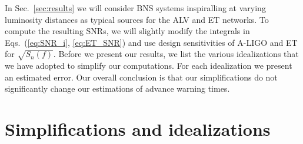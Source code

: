 \documentclass[prd,amsmath,amssymb,aps,floats,amsfonts,notitlepage,superscriptaddress,eqsecnum,nofootinbib,10pt]{revtex4-1}
\begin{document}
In Sec.~\ref{sec:results} we will consider BNS systems inspiralling at varying luminosity distances as typical sources for the ALV and ET networks.
To compute the resulting SNRs, we will slightly modify the integrals in Eqs.~(\ref{eq:SNR_i}, \ref{eq:ET_SNR}) and 
use design sensitivities of A-LIGO and ET for $\sqrt{S_n(f)}$.
Before we present our results, we list the various idealizations that we have adopted to simplify our computations.
For each idealization we present an estimated error. %
Our overall conclusion is that our simplifications do not significantly change our estimations of advance warning times.%
%
%
%
%
\section{Simplifications and idealizations} %
\label{sec:idealizations}
\end{document}
